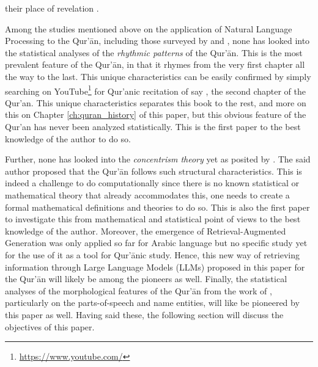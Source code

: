 their place of revelation .

Among the studies mentioned above on the application of Natural Language Processing to the Qur'\=an, including those surveyed by  and , none has looked into the statistical analyses of the \textit{rhythmic patterns} of the Qur'\=an. This is the most prevalent feature of the Qur'\=an, in that it rhymes from the very first chapter all the way to the last. This unique characteristics can be easily confirmed by simply searching on YouTube\footnote{\url{https://www.youtube.com/}} for Qur'anic recitation of say  , the second chapter of the Qur'an. This unique characteristics separates this book to the rest, and more on this on Chapter \ref{ch:quran_history} of this paper, but this obvious feature of the Qur'an has never been analyzed statistically. This is the first paper to the best knowledge of the author to do so. 

Further, none has looked into the \textit{concentrism theory} yet as posited by . The said author proposed that the Qur'\=an follows such structural characteristics. This is indeed a challenge to do computationally since there is no known statistical or mathematical theory that already accommodates this, one needs to create a formal mathematical definitions and theories to do so. This is also the first paper to investigate this from mathematical and statistical point of views to the best knowledge of the author. Moreover, the emergence of Retrieval-Augmented Generation was only applied so far for Arabic language  but no specific study yet for the use of it as a tool for Qur'\=anic study. Hence, this new way of retrieving information through Large Language Models (LLMs) proposed in this paper for the Qur'\=an will likely be among the pioneers as well. Finally, the statistical analyses of the morphological features of the Qur'\=an from the work of , particularly on the parts-of-speech and name entities, will like be pioneered by this paper as well. Having said these, the following section will discuss the objectives of this paper.

